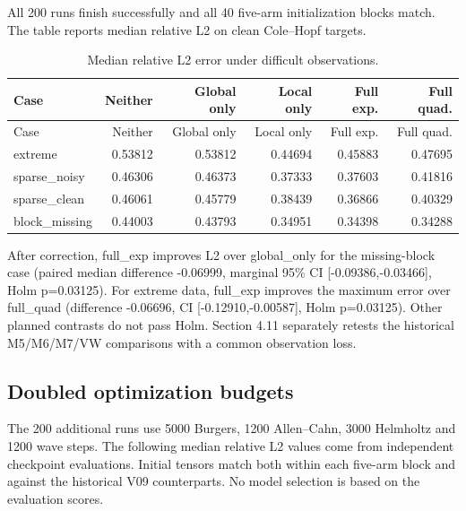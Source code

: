 \documentclass[
  11pt,
]{article}
\begin{document}
All 200 runs finish successfully and all 40 five-arm initialization
blocks match. The table reports median relative L2 on clean Cole--Hopf
targets.

\begingroup\small

\begin{longtable}[]{@{}lrrrrr@{}}
\caption{Median relative L2 error under difficult
observations.}\tabularnewline
\toprule\noalign{}
Case & Neither & Global only & Local only & Full exp. & Full quad. \\
\midrule\noalign{}
\endfirsthead
\toprule\noalign{}
Case & Neither & Global only & Local only & Full exp. & Full quad. \\
\midrule\noalign{}
\endhead
\bottomrule\noalign{}
\endlastfoot
extreme & 0.53812 & 0.53812 & 0.44694 & 0.45883 & 0.47695 \\
sparse\_noisy & 0.46306 & 0.46373 & 0.37333 & 0.37603 & 0.41816 \\
sparse\_clean & 0.46061 & 0.45779 & 0.38439 & 0.36866 & 0.40329 \\
block\_missing & 0.44003 & 0.43793 & 0.34951 & 0.34398 & 0.34288 \\
\end{longtable}

\endgroup

After correction, full\_exp improves L2 over global\_only for the
missing-block case (paired median difference -0.06999, marginal 95\% CI
{[}-0.09386,-0.03466{]}, Holm p=0.03125). For extreme data, full\_exp
improves the maximum error over full\_quad (difference -0.06696, CI
{[}-0.12910,-0.00587{]}, Holm p=0.03125). Other planned contrasts do not
pass Holm. Section 4.11 separately retests the historical M5/M6/M7/VW
comparisons with a common observation loss.

\hypertarget{doubled-optimization-budgets}{%
\subsection{Doubled optimization
budgets}\label{doubled-optimization-budgets}}

The 200 additional runs use 5000 Burgers, 1200 Allen--Cahn, 3000
Helmholtz and 1200 wave steps. The following median relative L2 values
come from independent checkpoint evaluations. Initial tensors match both
within each five-arm block and against the historical V09 counterparts.
No model selection is based on the evaluation scores.

\begingroup\small
\end{document}

